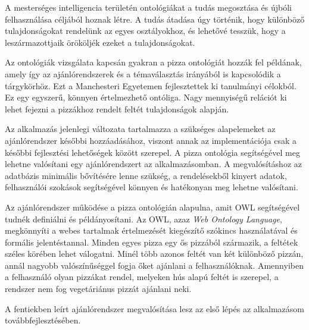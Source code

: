 
A mesterséges intelligencia területén ontológiákat a tudás megosztása és újbóli felhasználása céljából hoznak létre. A tudás átadása úgy történik, hogy különböző tulajdonságokat rendelünk az egyes osztályokhoz, és lehetővé tesszük, hogy a leszármazottjaik örököljék ezeket a tulajdonságokat.

Az ontológiák vizsgálata kapcsán gyakran a pizza ontológiát hozzák fel példának, amely így az ajánlórendszerek és a témaválasztás irányából is kapcsolódik a tárgykörhöz. Ezt a Manchesteri Egyetemen fejlesztettek ki tanulmányi célokból. Ez egy egyszerű, könnyen értelmezhető ontóliga. Nagy mennyiségű relációt ki lehet fejezni a pizzákhoz rendelt feltét tulajdonságok alapján.

Az alkalmazás jelenlegi változata tartalmazza a szükséges alapelemeket az ajánlórendszer későbbi hozzáadásához, viszont annak az implementációja csak a későbbi fejlesztési lehetőségek között szerepel. A pizza ontológia segítségével meg lehetne valósítani egy ajánlórendszert az alkalmazásomban. A megvalósításhoz az adatbázis minimális bővítésére lenne szükség, a rendelésekből kinyert adatok, felhasználói szokások segítségével könnyen és hatékonyan meg lehetne valósítani.

Az ajánlórendszer működése a pizza ontológián alapulna, amit OWL segítségével tudnék definiálni és példányosítani. Az OWL, azaz \textit{Web Ontology Language}, megkönnyíti a webes tartalmak értelmezését kiegészítő szókincs használatával és formális jelentéstannal. Minden egyes pizza egy ős pizzából származik, a feltétek széles körében lehet válogatni. Minél több azonos feltét van két különböző pizzán, annál nagyobb valószínűséggel fogja őket ajánlani a felhasználóknak. Amennyiben a felhasználó olyan pizzákat rendel, melyeken hús alapú feltét is szerepel, a rendszer nem fog vegetáriánus pizzát ajánlani neki.

A fentiekben leírt ajánlórendszer megvalósítása lesz az első lépés az alkalmazásom továbbfejlesztésében. 
